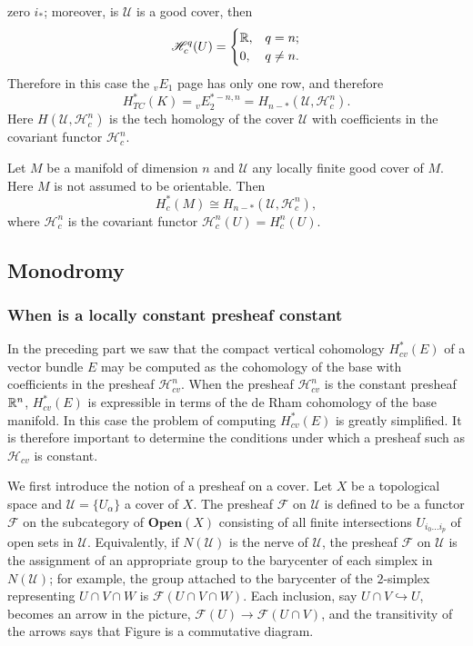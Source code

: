 zero $i_*$; moreover, is $\mathcal{U}$ is a good cover, then
\[\mathscr{H}_c^q(U)=\begin{cases}
\mathbb{R},&q=n;\\
0,&q\neq n.
\end{cases}\]
Therefore in this case the $_{v}E_1$ page has only one row, and therefore
\[H^*_{TC}(K)={_{v}E_2^{*-n,n}}=H_{n-*}(\mathcal{U},\mathscr{H}^n_c).\]
Here $H(\mathcal{U},\mathscr{H}^n_c)$ is the tech homology of the cover $\mathcal{U}$ with coefficients in the covariant functor $\mathscr{H}_c^{n}$.
\begin{proposition}
Let $M$ be a manifold of dimension $n$ and $\mathcal{U}$ any locally finite good cover of $M$. Here $M$ is not assumed to be orientable. Then
\[H^*_c(M)\cong H_{n-*}(\mathcal{U},\mathscr{H}^n_c),\]
where $\mathscr{H}^n_c$ is the covariant functor $\mathscr{H}^n_c(U)=H^n_c(U)$.
\end{proposition}
\subsection{Monodromy}
\subsubsection{When is a locally constant presheaf constant}
In the preceding part we saw that the compact vertical cohomology $H^*_{cv}(E)$ of a vector bundle $E$ may be computed as the cohomology of the base with 
coefficients in the presheaf $\mathscr{H}_{cv}^n$. When the presheaf $\mathscr{H}_{cv}^n$ is the constant presheaf $\mathbb{R}^n$, $H^*_{cv}(E)$ is expressible in terms of the 
de Rham cohomology of the base manifold. In this case the problem of computing $H^*_{cv}(E)$ is greatly simplified. It is therefore important to 
determine the conditions under which a presheaf such as $\mathscr{H}_{cv}$ is constant.\par
We first introduce the notion of a presheaf on a cover. Let $X$ be a topological space and $\mathcal{U}=\{U_\alpha\}$ a cover of $X$. The presheaf $\mathscr{F}$ on 
$\mathcal{U}$ is defined to be a functor $\mathscr{F}$ on the subcategory of $\mathbf{Open}(X)$ consisting of all finite intersections $U_{i_0\dots i_p}$ of open sets in 
$\mathcal{U}$. Equivalently, if $N(\mathcal{U})$ is the nerve of $\mathcal{U}$, the presheaf $\mathscr{F}$ on $\mathcal{U}$ is the assignment of an appropriate group to 
the barycenter of each simplex in $N(\mathcal{U})$; for example, the group attached to the barycenter of the $2$-simplex representing $U\cap V\cap W$ is 
$\mathscr{F}(U\cap V\cap W)$. Each inclusion, say $U\cap V\hookrightarrow U$, becomes an arrow in the picture, $\mathscr{F}(U)\to\mathscr{F}(U\cap V)$, and the 
transitivity of the arrows says that Figure is a commutative diagram.


